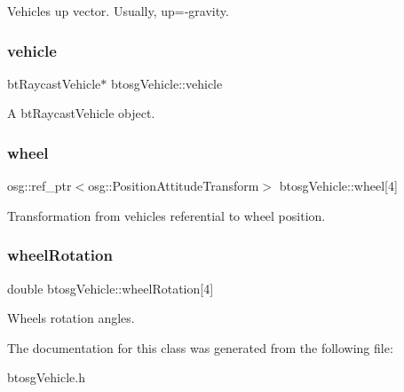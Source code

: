 Vehicle\textquotesingle{}s up vector. Usually, up=-\/gravity. 

\mbox{\label{classbtosgVehicle_ac45b117f8b523f7040de99639deb7522}} 
\subsubsection{\texorpdfstring{vehicle}{vehicle}}
{\footnotesize\ttfamily bt\+Raycast\+Vehicle$\ast$ btosg\+Vehicle\+::vehicle}



A bt\+Raycast\+Vehicle object. 

\mbox{\label{classbtosgVehicle_a37edb4c28551037829ffd79c7bc315ba}} 
\subsubsection{\texorpdfstring{wheel}{wheel}}
{\footnotesize\ttfamily osg\+::ref\+\_\+ptr$<$osg\+::\+Position\+Attitude\+Transform$>$ btosg\+Vehicle\+::wheel\mbox{[}4\mbox{]}}



Transformation from vehicle\textquotesingle{}s referential to wheel position. 

\mbox{\label{classbtosgVehicle_a0a9cd6f2c9b0defc44cd5e2e8d597418}} 
\subsubsection{\texorpdfstring{wheelRotation}{wheelRotation}}
{\footnotesize\ttfamily double btosg\+Vehicle\+::wheel\+Rotation\mbox{[}4\mbox{]}}



Wheels\textquotesingle{} rotation angles. 



The documentation for this class was generated from the following file\+:\begin{DoxyCompactItemize}
\item 
btosg\+Vehicle.\+h\end{DoxyCompactItemize}
